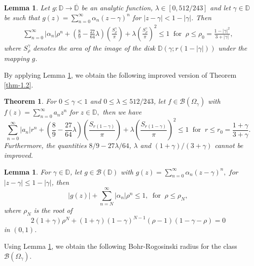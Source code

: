 \documentclass[a4paper,12pt]{amsart}
\theoremstyle{plain}
\newtheorem{thm}[equation]{Theorem}
\newtheorem{lem}[equation]{Lemma}
\theoremstyle{definition}
\begin{document}
\begin{lem}\label{lem-2.7}
	Let $ g : \mathbb{D}\rightarrow\overline{\mathbb{D}} $ be an analytic function, $ \lambda\in [0,512/243] $ and let $ \gamma\in\mathbb{D} $ be such that $ g(z)=\sum_{n=0}^{\infty}\alpha_n(z-\gamma)^n $ for $ |z-\gamma|<1-|\gamma| $. Then 
	\begin{align*}
		\sum_{n=0}^{\infty}|\alpha_n|\rho^n+\left(\frac{8}{9}-\frac{27}{64}\lambda\right)\left(\frac{S^{\gamma}_{\rho}}{\pi}\right)+\lambda\left(\frac{S^{\gamma}_{\rho}}{\pi}\right)^2\leq 1\;\; \text{for}\;\; \rho\leq \rho_0=\frac{1-|\gamma|^2}{3+|\gamma|},
	\end{align*}
	where $ S^{\gamma}_{\rho} $ denotes the area of the image of the disk $ \mathbb{D}(\gamma;r(1-|\gamma|)) $ under the mapping  $ g $.
\end{lem}
\noindent By applying Lemma \ref{lem-2.7}, we obtain the following improved version of Theorem \ref{thm-1.2}.
\begin{thm}\label{th-3.2}
	For $ 0\leq \gamma<1 $ and $ 0\leq \lambda\leq 512/243 $, let $ f\in\mathcal{B}(\Omega_{\gamma}) $ with $ f(z)=\sum_{n=0}^{\infty}a_nz^n $ for $ z\in\mathbb{D}, $ then we have 
	\begin{equation*}
		\sum_{n=0}^{\infty}|a_n|r^n+\left(\frac{8}{9}-\frac{27}{64}\lambda\right)\left(\frac{S_{r(1-\gamma)}}{\pi}\right)+\lambda\left(\frac{S_{r(1-\gamma)}}{\pi}\right)^2\leq 1 \;\; \text{for}\;\; r\leq r_0=\frac{1+\gamma}{3+\gamma}.
	\end{equation*}
Furthermore, the quantities $ 8/9-27\lambda/64 $, $ \lambda $ and $ (1+\gamma)/(3+\gamma) $ cannot be improved. 
\end{thm}
\begin{lem}\label{lem-2.1}
	For $ \gamma\in\mathbb{D} $, let $ g\in\mathcal{B}(\mathbb{D}) $ with $ g(z)=\sum_{n=0}^{\infty}\alpha_n(z-\gamma)^n,\; for $ $ |z-\gamma|\leq 1-|\gamma| $, then 
	\begin{equation*}
		|g(z)|+\sum_{n=N}^{\infty}|\alpha_n|\rho^n\leq 1,\;\; \text{for}\;\; \rho\leq\rho_N,
	\end{equation*}
	where $ \rho_N $ is the root of 
	\begin{equation*}
		2(1+\gamma)\rho^N+ (1+\gamma)(1-\gamma)^{N-1}(\rho-1)(1-\gamma-\rho)=0
	\end{equation*}
	in $(0,1)$.
\end{lem}
\noindent Using Lemma \ref{lem-2.1}, we obtain the following Bohr-Rogosinski radius for the class $\mathcal{B}(\Omega_{\gamma})$.
\end{document}
